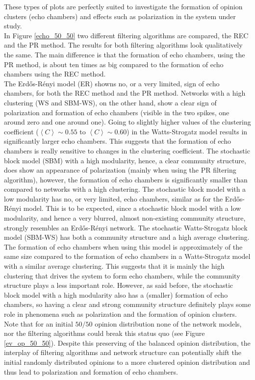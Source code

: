 \documentclass[11 pt , letterpaper , twoside , openright]{book}
\begin{document}
These types of plots are perfectly suited to investigate the formation of opinion clusters (echo chambers) and effects such as polarization in the system under study.\\
In Figure \ref{echo_50_50} two different filtering algorithms are compared, the REC and the PR method. The results for both filtering algorithms look qualitatively the same. The main difference is that the formation of echo chambers, using the PR method, is about ten times as big compared to the formation of echo chambers using the REC method. \\
The Erd\H{o}s-R\'{e}nyi model (ER) showns no, or a very limited, sign of echo chambers, for both the REC method and the PR method. Networks with a high clustering (WS and SBM-WS), on the other hand, show a clear sign of polarization and formation of echo chambers (visible in the two spikes, one around zero and one around one). Going to slightly higher values of the clustering coefficient ($\left<C\right> \sim 0.55$ to $\left<C\right> \sim 0.60$) in the Watts-Strogatz model results in significantly larger echo chambers. This suggests that the formation of echo chambers is really sensitive to changes in the clustering coefficient. The stochastic block model (SBM) with a high modularity, hence, a clear community structure, does show an appearance of polarization (mainly when using the PR filtering algorithm), however, the formation of echo chambers is significantly smaller than compared to networks with a high clustering. The stochastic block model with a low modularity has no, or very limited, echo chambers, similar as for the Erd\H{o}s-R\'{e}nyi   
model. This is to be expected, since a stochastic block model with a low modularity, and hence a very blurred, almost non-existing community structure, strongly resembles an Erd\H{o}s-R\'{e}nyi network. The stochastic Watts-Strogatz block model (SBM-WS) has both a community structure and a high average clustering. The formation of echo chambers when using this model is approximately of the same size compared to the formation of echo chambers in a Watts-Strogatz model with a similar average clustering. This suggests that it is mainly the high clustering that drives the system to form echo chambers, while the community structure plays a less important role. However, as said before, the stochastic block model with a high modularity also has a (smaller) formation of echo chambers, so having a clear and strong community structure definitely plays some role in phenomena such as polarization and the formation of opinion clusters. \\
Note that for an initial $50/50$ opinion distribution none of the network models, nor the filtering algorithms could break this status quo (see Figure \ref{ev_op_50_50}). Despite this preserving of the balanced opinion distribution, the interplay of filtering algorithms and network structure can potentially shift the initial randomly distributed opinions to a more clustered opinion distribution and thus lead to polarization and formation of echo chambers.
\end{document}
